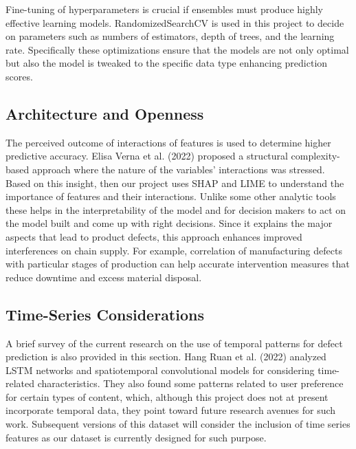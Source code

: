 \documentclass[conference]{IEEEtran}
\begin{document}
Fine-tuning of hyperparameters is crucial if ensembles must produce highly effective learning models. RandomizedSearchCV is used in this project to decide on parameters such as numbers of estimators, depth of trees, and the learning rate. Specifically these optimizations ensure that the models are not only optimal but also the model is tweaked to the specific data type enhancing prediction scores.

\subsection{Architecture and Openness}
The perceived outcome of interactions of features is used to determine higher predictive accuracy. Elisa Verna et al. (2022) \cite{verna2022defect} proposed a structural complexity-based approach where the nature of the variables’ interactions was stressed. Based on this insight, then our project uses SHAP and LIME to understand the importance of features and their interactions. Unlike some other analytic tools these helps in the interpretability of the model and for decision makers to act on the model built and come up with right decisions. Since it explains the major aspects that lead to product defects, this approach enhances improved interferences on chain supply. For example, correlation of manufacturing defects with particular stages of production can help accurate intervention measures that reduce downtime and excess material disposal.

\subsection{Time-Series Considerations}
A brief survey of the current research on the use of temporal patterns for defect prediction is also provided in this section. Hang Ruan et al. (2022) \cite{ruan2022deep} analyzed LSTM networks and spatiotemporal convolutional models for considering time-related characteristics. They also found some patterns related to user preference for certain types of content, which, although this project does not at present incorporate temporal data, they point toward future research avenues for such work. Subsequent versions of this dataset will consider the inclusion of time series features as our dataset is currently designed for such purpose.
\end{document}

